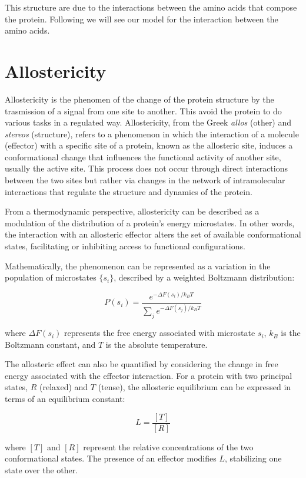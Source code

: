\documentclass[English, Lau, oneside]{sapthesis}
\begin{document}
This structure are due to the interactions between the amino acids that compose the protein. 
Following we will see our model for the interaction between the amino acids.

\section{Allostericity}
Allostericity is the phenomen of the change of the protein structure by the trasmission of a signal from one site to another.
This avoid the protein to do various tasks in a regulated way.
Allostericity, from the Greek \textit{allos} (other) and \textit{stereos} (structure), refers to a phenomenon in which the interaction of a molecule (effector) with a specific site of a protein, known as the allosteric site, induces a conformational change that influences the functional activity of another site, usually the active site. This process does not occur through direct interactions between the two sites but rather via changes in the network of intramolecular interactions that regulate the structure and dynamics of the protein.

From a thermodynamic perspective, allostericity can be described as a modulation of the distribution of a protein's energy microstates. In other words, the interaction with an allosteric effector alters the set of available conformational states, facilitating or inhibiting access to functional configurations.

Mathematically, the phenomenon can be represented as a variation in the population of microstates \(\{s_i\}\), described by a weighted Boltzmann distribution:

\[
P(s_i) = \frac{e^{-\Delta F(s_i)/k_BT}}{\sum_j e^{-\Delta F(s_j)/k_BT}}
\]

where \(\Delta F(s_i)\) represents the free energy associated with microstate \(s_i\), \(k_B\) is the Boltzmann constant, and \(T\) is the absolute temperature.

The allosteric effect can also be quantified by considering the change in free energy associated with the effector interaction. For a protein with two principal states, \(R\) (relaxed) and \(T\) (tense), the allosteric equilibrium can be expressed in terms of an equilibrium constant:

\[
L = \frac{[T]}{[R]}
\]

where \([T]\) and \([R]\) represent the relative concentrations of the two conformational states. The presence of an effector modifies \(L\), stabilizing one state over the other.
\end{document}
